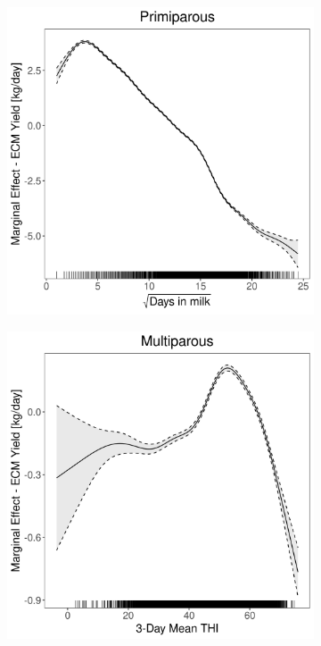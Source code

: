 \begin{figure}[H]
\begin{subfigure}[b]{0.45\textwidth}
    \end{subfigure}
    \hspace{0.05\textwidth} %
    \begin{subfigure}[b]{0.45\textwidth}
        \centering
        \includegraphics[width=\textwidth]{thesis/figures/models/ecm/full/ob_ecm_full/ob_ecm_full_marginal_dim_milk_primi.png}
    \end{subfigure}
    \begin{subfigure}[b]{0.45\textwidth}
        \centering
        \includegraphics[width=\textwidth]{thesis/figures/models/ecm/full/ob_ecm_full/ob_ecm_full_marginal_thi_milk_multi.png}

\end{subfigure}
\end{figure}
